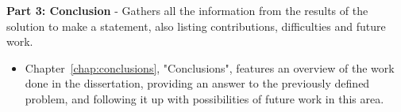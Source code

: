 \par \textbf{Part 3: Conclusion} - Gathers all the information from the results of the solution to make a statement, also listing contributions, difficulties and future work.
\begin{itemize}
  \item Chapter~\ref{chap:conclusions}, "Conclusions", features an overview of the work done in the dissertation, providing an answer to the previously defined problem, and following it up with possibilities of future work in this area.
\end{itemize}